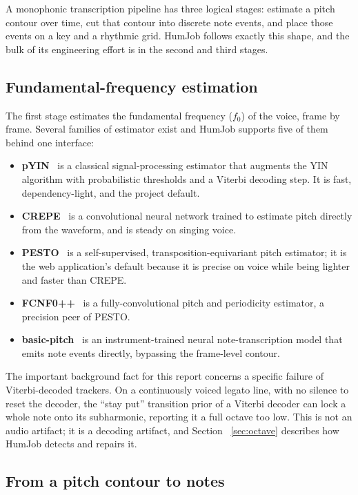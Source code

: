 \documentclass[12pt,a4paper]{article}
\begin{document}
A monophonic transcription pipeline has three logical stages: estimate a pitch
contour over time, cut that contour into discrete note events, and place those
events on a key and a rhythmic grid. HumJob follows exactly this shape, and the
bulk of its engineering effort is in the second and third stages.

\subsection{Fundamental-frequency estimation}

The first stage estimates the fundamental frequency ($f_0$) of the voice, frame
by frame. Several families of estimator exist and HumJob supports five of them
behind one interface:

\begin{itemize}
    \item \textbf{pYIN}~\cite{pyin} is a classical signal-processing estimator
    that augments the YIN algorithm with probabilistic thresholds and a Viterbi
    decoding step. It is fast, dependency-light, and the project default.
    \item \textbf{CREPE}~\cite{crepe} is a convolutional neural network trained
    to estimate pitch directly from the waveform, and is steady on singing
    voice.
    \item \textbf{PESTO}~\cite{pesto} is a self-supervised,
    transposition-equivariant pitch estimator; it is the web application's
    default because it is precise on voice while being lighter and faster than
    CREPE.
    \item \textbf{FCNF0++}~\cite{penn} is a fully-convolutional pitch and
    periodicity estimator, a precision peer of PESTO.
    \item \textbf{basic-pitch}~\cite{basicpitch} is an instrument-trained
    neural note-transcription model that emits note events directly, bypassing
    the frame-level contour.
\end{itemize}

The important background fact for this report concerns a specific failure of
Viterbi-decoded trackers. On a continuously voiced legato line, with no silence
to reset the decoder, the ``stay put'' transition prior of a Viterbi decoder
can lock a whole note onto its subharmonic, reporting it a full octave too low.
This is not an audio artifact; it is a decoding artifact, and Section~%
\ref{sec:octave} describes how HumJob detects and repairs it.

\subsection{From a pitch contour to notes}
\end{document}
